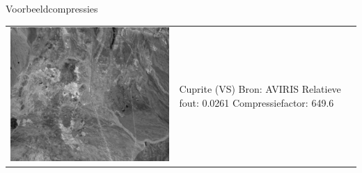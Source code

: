 \documentclass[t,12pt,dutch
\ifx\beamermode\undefined\else,\beamermode\fi
]{beamer}
\begin{document}
\begin{frame}{Voorbeeldcompressies}

\begin{table}[H]
\centering
\begin{tabular}{C{0.6\textwidth}  L{0.4\textwidth}}
\includegraphics[width=\linewidth]{images/example_compression_Cuprite_0_025.png}
&
Cuprite (VS)\newline
Bron: AVIRIS \cite{ref:ehu_aviris_cuprite}\newline
\vspace{5mm}
Relatieve fout: 0.0261
Compressiefactor: 649.6
\end{tabular}
\end{table}

\end{frame}
\end{document}
